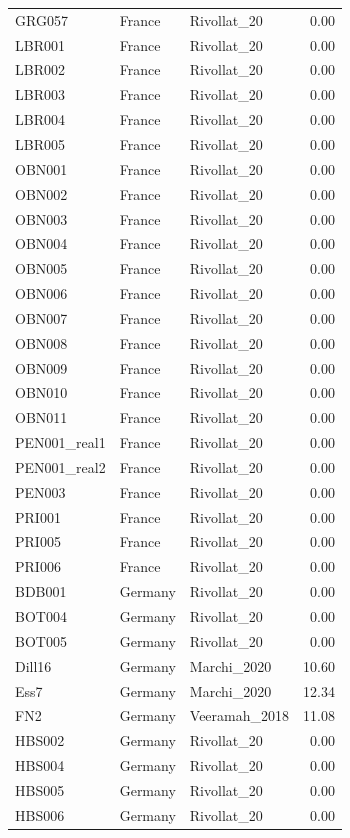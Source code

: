 \begin{longtable}[t]{lllr}
GRG057 & France & Rivollat\_20 & 0.00\\
LBR001 & France & Rivollat\_20 & 0.00\\
LBR002 & France & Rivollat\_20 & 0.00\\
LBR003 & France & Rivollat\_20 & 0.00\\
LBR004 & France & Rivollat\_20 & 0.00\\
LBR005 & France & Rivollat\_20 & 0.00\\
OBN001 & France & Rivollat\_20 & 0.00\\
OBN002 & France & Rivollat\_20 & 0.00\\
OBN003 & France & Rivollat\_20 & 0.00\\
OBN004 & France & Rivollat\_20 & 0.00\\
OBN005 & France & Rivollat\_20 & 0.00\\
OBN006 & France & Rivollat\_20 & 0.00\\
OBN007 & France & Rivollat\_20 & 0.00\\
OBN008 & France & Rivollat\_20 & 0.00\\
OBN009 & France & Rivollat\_20 & 0.00\\
OBN010 & France & Rivollat\_20 & 0.00\\
OBN011 & France & Rivollat\_20 & 0.00\\
PEN001\_real1 & France & Rivollat\_20 & 0.00\\
PEN001\_real2 & France & Rivollat\_20 & 0.00\\
PEN003 & France & Rivollat\_20 & 0.00\\
PRI001 & France & Rivollat\_20 & 0.00\\
PRI005 & France & Rivollat\_20 & 0.00\\
PRI006 & France & Rivollat\_20 & 0.00\\
BDB001 & Germany & Rivollat\_20 & 0.00\\
BOT004 & Germany & Rivollat\_20 & 0.00\\
BOT005 & Germany & Rivollat\_20 & 0.00\\
Dill16 & Germany & Marchi\_2020 & 10.60\\
Ess7 & Germany & Marchi\_2020 & 12.34\\
FN2 & Germany & Veeramah\_2018 & 11.08\\
HBS002 & Germany & Rivollat\_20 & 0.00\\
HBS004 & Germany & Rivollat\_20 & 0.00\\
HBS005 & Germany & Rivollat\_20 & 0.00\\
HBS006 & Germany & Rivollat\_20 & 0.00\\

\end{longtable}
